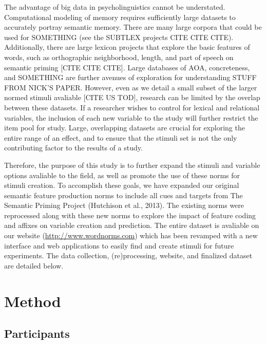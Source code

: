\documentclass[english,man]{apa6}
\theoremstyle{definition}
\theoremstyle{definition}
\theoremstyle{definition}
\theoremstyle{remark}
\begin{document}
The advantage of big data in psycholinguistics cannot be understated.
Computational modeling of memory requires sufficiently large datasets to
accurately portray semantic memory. There are many large corpora that
could be used for SOMETHING (see the SUBTLEX projects CITE CITE CITE).
Additionally, there are large lexicon projects that explore the basic
features of words, such as orthographic neighborhood, length, and part
of speech on semantic priming {[}CITE CITE CITE{]}. Large databases of
AOA, concreteness, and SOMETHING are further avenues of exploration for
understanding STUFF FROM NICK'S PAPER. However, even as we detail a
small subset of the larger normed stimuli avaliable {[}CITE US TOD{]},
research can be limited by the overlap between these datasets. If a
researcher wishes to control for lexical and relational variables, the
inclusion of each new variable to the study will further restrict the
item pool for study. Large, overlapping datasets are crucial for
exploring the entire range of an effect, and to ensure that the stimuli
set is not the only contributing factor to the results of a study.

Therefore, the purpose of this study is to further expand the stimuli
and variable options avaliable to the field, as well as promote the use
of these norms for stimuli creation. To accomplish these goals, we have
expanded our original semantic feature production norms to include all
cues and targets from The Semantic Priming Project (Hutchison et al.,
2013). The existing norms were reprocessed along with these new norms to
explore the impact of feature coding and affixes on variable creation
and prediction. The entire dataset is avaliable on our website
(\url{http://www.wordnorms.com}) which has been revamped with a new
interface and web applications to easily find and create stimuli for
future experiments. The data collection, (re)processing, website, and
finalized dataset are detailed below.

\section{Method}\label{method}

\subsection{Participants}\label{participants}
\end{document}
